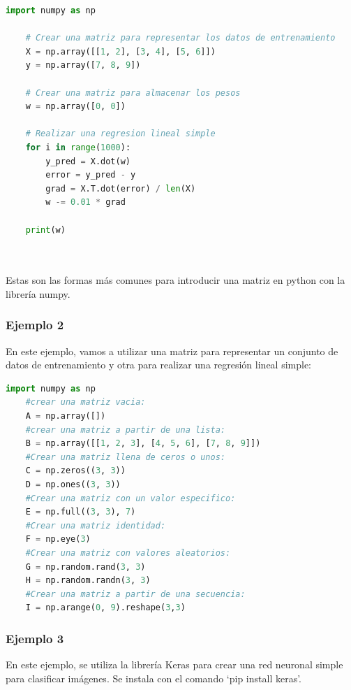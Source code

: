 \documentclass{article}
\theoremstyle{mytheoremstyle}
\theoremstyle{mytheoremstyle}
\theoremstyle{myproblemstyle}
\begin{document}
\begin{lstlisting}[language=Python]
    import numpy as np

    # Crear una matriz para representar los datos de entrenamiento
    X = np.array([[1, 2], [3, 4], [5, 6]])
    y = np.array([7, 8, 9])
    
    # Crear una matriz para almacenar los pesos
    w = np.array([0, 0])
    
    # Realizar una regresion lineal simple
    for i in range(1000):
        y_pred = X.dot(w)
        error = y_pred - y
        grad = X.T.dot(error) / len(X)
        w -= 0.01 * grad
    
    print(w)
    
    
\end{lstlisting}
Estas son las formas más comunes para introducir una matriz en python con la librería numpy.

\subsubsection{Ejemplo 2}

En este ejemplo, vamos a utilizar una matriz para representar un conjunto de datos de entrenamiento y otra para realizar una regresión lineal simple:

\begin{lstlisting}[language=Python]
    import numpy as np
    #crear una matriz vacia:
    A = np.array([])
    #crear una matriz a partir de una lista:
    B = np.array([[1, 2, 3], [4, 5, 6], [7, 8, 9]])
    #Crear una matriz llena de ceros o unos:
    C = np.zeros((3, 3))
    D = np.ones((3, 3))
    #Crear una matriz con un valor especifico:
    E = np.full((3, 3), 7)
    #Crear una matriz identidad:
    F = np.eye(3)
    #Crear una matriz con valores aleatorios:
    G = np.random.rand(3, 3)
    H = np.random.randn(3, 3)
    #Crear una matriz a partir de una secuencia:
    I = np.arange(0, 9).reshape(3,3)
\end{lstlisting}

\subsubsection{Ejemplo 3}

En este ejemplo, se utiliza la librería Keras para crear una red neuronal simple para clasificar imágenes. Se instala con el comando ‘pip install keras’.
\end{document}
